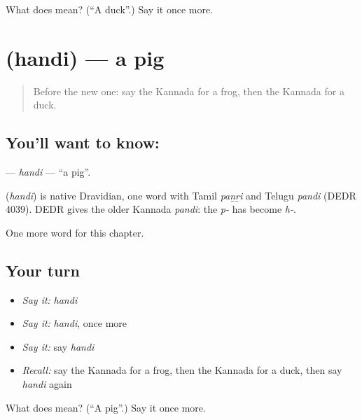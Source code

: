 \begin{tcolorbox}[breakable,colback=teal!4,colframe=teal!35!black,title={Before you move on}]
What does  mean? (\textquotedblleft{}A duck\textquotedblright{}.) Say it once more.
\end{tcolorbox}
\section[\texorpdfstring{\kn{ಹಂದಿ} (handi)}{ಹಂದಿ (handi)}]{ (handi) — a pig}

\label{lesson:KA-C133-handi}



\begin{quote}
Before the new one: say the Kannada for a frog, then the Kannada for a duck.
\end{quote}

\subsection*{You'll want to know: }
\textbf{} — \emph{handi} — \textquotedblleft{}a pig\textquotedblright{}.

\begin{cousinweb}
\textbf{} (\emph{handi}) is native Dravidian, one word with Tamil \emph{paṉṟi} and Telugu \emph{pandi} (DEDR 4039). DEDR gives the older Kannada \emph{pandi}: the \emph{p-} has become \emph{h-}.
\end{cousinweb}

\begin{grammarlens}[title={What you've built}]
One more word for this chapter.
\end{grammarlens}

\subsection*{Your turn}
\begin{itemize}
\raggedright
  \item \emph{Say it:} \emph{handi}
  \item \emph{Say it:} \emph{handi}, once more
  \item \emph{Say it:} say \emph{handi}
  \item \emph{Recall:} say the Kannada for a frog, then the Kannada for a duck, then say \emph{handi} again
\end{itemize}

\begin{tcolorbox}[breakable,colback=teal!4,colframe=teal!35!black,title={Before you move on}]
What does  mean? (\textquotedblleft{}A pig\textquotedblright{}.) Say it once more.
\end{tcolorbox}
